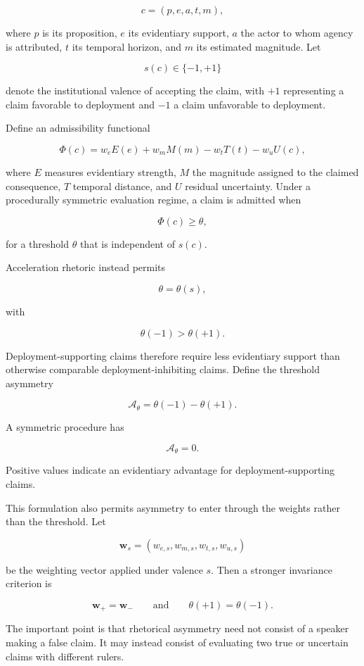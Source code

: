 \documentclass[11pt]{article}
\begin{document}
\[
c=(p,e,a,t,m),
\]

where \(p\) is its proposition, \(e\) its evidentiary support, \(a\) the actor
to whom agency is attributed, \(t\) its temporal horizon, and \(m\) its
estimated magnitude. Let

\[
s(c)\in\{-1,+1\}
\]

denote the institutional valence of accepting the claim, with \(+1\)
representing a claim favorable to deployment and \(-1\) a claim unfavorable
to deployment.

Define an admissibility functional

\[
\Phi(c)
=
w_e E(e)
+w_m M(m)
-w_t T(t)
-w_u U(c),
\]

where \(E\) measures evidentiary strength, \(M\) the magnitude assigned to the
claimed consequence, \(T\) temporal distance, and \(U\) residual uncertainty.
Under a procedurally symmetric evaluation regime, a claim is admitted when

\[
\Phi(c)\geq\theta,
\]

for a threshold \(\theta\) that is independent of \(s(c)\).

Acceleration rhetoric instead permits

\[
\theta=\theta(s),
\]

with

\[
\theta(-1)>\theta(+1).
\]

Deployment-supporting claims therefore require less evidentiary support than
otherwise comparable deployment-inhibiting claims. Define the threshold
asymmetry

\[
\mathcal A_{\theta}
=
\theta(-1)-\theta(+1).
\]

A symmetric procedure has

\[
\mathcal A_{\theta}=0.
\]

Positive values indicate an evidentiary advantage for deployment-supporting
claims.

This formulation also permits asymmetry to enter through the weights rather
than the threshold. Let

\[
\mathbf w_s
=
(w_{e,s},w_{m,s},w_{t,s},w_{u,s})
\]

be the weighting vector applied under valence \(s\). Then a stronger
invariance criterion is

\[
\mathbf w_{+}=\mathbf w_{-}
\qquad\text{and}\qquad
\theta(+1)=\theta(-1).
\]

The important point is that rhetorical asymmetry need not consist of a
speaker making a false claim. It may instead consist of evaluating two true
or uncertain claims with different rulers.
\end{document}
